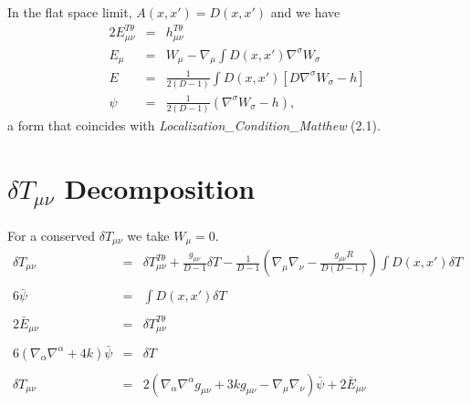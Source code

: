 \documentclass[10pt,letterpaper]{article}
\numberwithin{equation}{section}
\begin{document}
In the flat space limit, $A(x,x')=D(x,x')$ and we have
\begin{eqnarray}
2E_{\mu\nu}^{T\theta} &=& h_{\mu\nu}^{T\theta}
\nonumber\\
E_\mu &=& W_\mu - \nabla_\mu\int D(x,x')\nabla^\sigma W_\sigma
\nonumber\\
E &=& \frac{1}{2(D-1)}\int D(x,x') [D\nabla^\sigma W_\sigma -h]
\nonumber\\ 
\psi &=& \frac{1}{2(D-1)}\left( \nabla^\sigma W_\sigma -h \right),
\end{eqnarray}
a form that coincides with \emph{Localization\_Condition\_Matthew} (2.1). 
\section{$\delta T_{\mu\nu}$ Decomposition}
For a conserved $\delta T_{\mu\nu}$ we take $W_\mu=0$.
\begin{eqnarray}
\delta T_{\mu\nu} &=& \delta T_{\mu\nu}^{T\theta} + \frac{g_{\mu\nu}}{D-1} \delta T
-\frac{1}{D-1}\left(\nabla_\mu\nabla_\nu - \frac{g_{\mu\nu}R}{D(D-1)}\right)\int D(x,x') \delta T 
\nonumber\\ \nonumber\\
6\bar\psi &=&\int D(x,x')\delta T
\nonumber\\ \nonumber\\
2\bar E_{\mu\nu} &=& \delta T_{\mu\nu}^{T\theta}
\nonumber\\ \nonumber\\
6(\nabla_\alpha\nabla^\alpha + 4k)\bar\psi &=& \delta T
\nonumber\\ \nonumber\\
\delta T_{\mu\nu} &=& 
2\left( \nabla_\alpha\nabla^\alpha g_{\mu\nu} +3k g_{\mu\nu} - \nabla_\mu\nabla_\nu\right)\bar\psi + 2\bar E_{\mu\nu}
\end{eqnarray}

\end{document}
